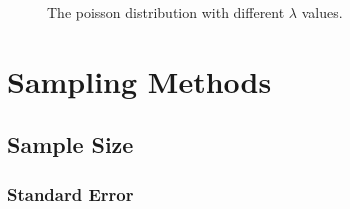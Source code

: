 \documentclass[
  a4paper,
]{scrbook}
\begin{document}
\begin{figure}[ht]


\caption{\label{fig-pois}The poisson distribution with different
\(\lambda\) values.}

\end{figure}%


\chapter{Sampling Methods}\label{sampling-methods}

\section{Sample Size}\label{sample-size-1}

\subsection{Standard Error}\label{standard-error}
\end{document}
